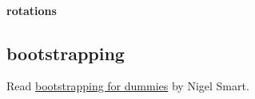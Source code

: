 \paragraph{rotations}
\subsection{bootstrapping}
Read \href{https://www.zama.ai/post/what-is-bootstrapping-homomorphic-encryption}{bootstrapping for dummies} by Nigel Smart.










